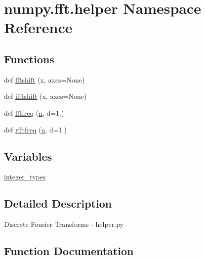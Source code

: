 \hypertarget{namespacenumpy_1_1fft_1_1helper}{}\section{numpy.\+fft.\+helper Namespace Reference}
\label{namespacenumpy_1_1fft_1_1helper}
\subsection*{Functions}
\begin{DoxyCompactItemize}
\item 
def \hyperlink{namespacenumpy_1_1fft_1_1helper_a22c90de47c6858514c37c73bd828454c}{fftshift} (x, axes=None)
\item 
def \hyperlink{namespacenumpy_1_1fft_1_1helper_a1aaac43e8e845143819108dd36806bdb}{ifftshift} (x, axes=None)
\item 
def \hyperlink{namespacenumpy_1_1fft_1_1helper_aeb20166d868dbf8bb6f1d8e2f18c4a4b}{fftfreq} (\hyperlink{namespacenumpy_a352663c52853d2754274407d5cae2832}{n}, d=1.)
\item 
def \hyperlink{namespacenumpy_1_1fft_1_1helper_a872e337cdb847c520be1ce05eb74533d}{rfftfreq} (\hyperlink{namespacenumpy_a352663c52853d2754274407d5cae2832}{n}, d=1.)
\end{DoxyCompactItemize}
\subsection*{Variables}
\begin{DoxyCompactItemize}
\item 
\hyperlink{namespacenumpy_1_1fft_1_1helper_aff459c0f23cb7dfcae7703efc7b3f6ca}{integer\+\_\+types}
\end{DoxyCompactItemize}


\subsection{Detailed Description}
\begin{DoxyVerb}Discrete Fourier Transforms - helper.py\end{DoxyVerb}
 

\subsection{Function Documentation}
\mbox{\label{namespacenumpy_1_1fft_1_1helper_aeb20166d868dbf8bb6f1d8e2f18c4a4b}} 
